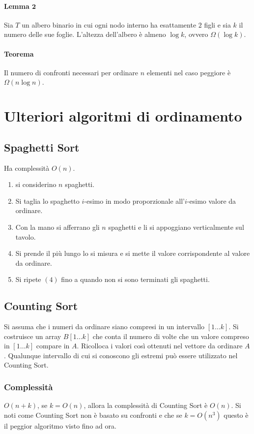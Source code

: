 \paragraph{Lemma $\mathbf{2}$}
Sia $T$ un albero binario in cui ogni nodo interno ha esattamente $2$ figli e sia $k$ il numero delle sue foglie. L'altezza dell'albero \`e almeno $\log k$, ovvero $\Omega(\log k)$. 
\paragraph{Teorema}
Il numero di confronti necessari per ordinare $n$ elementi nel caso peggiore \`e $\Omega(n\log n)$. 
\section{Ulteriori algoritmi di ordinamento}
\subsection{Spaghetti Sort}
Ha complessit\`a $O(n)$.
\begin{enumerate}
	\item si considerino $n$ spaghetti.
	\item Si taglia lo spaghetto $i$-esimo in modo proporzionale all'$i$-esimo valore da ordinare.
	\item Con la mano si afferrano gli $n$ spaghetti e li si appoggiano verticalmente sul tavolo. 
	\item Si prende il pi\`u lungo lo si misura e si mette il valore corrispondente al valore da ordinare. 
	\item Si ripete $(4)$ fino a quando non si sono terminati gli spaghetti. 
\end{enumerate}
\subsection{Counting Sort}
Si assuma che i numeri da ordinare siano compresi in un intervallo $[1\dots k]$. Si costruisce un array $B[1\dots k]$ che conta il numero di volte che un valore compreso in $[1\dots k]$
compare in $A$. Ricolloca i valori cos\`i ottenuti nel vettore da ordinare $A$. Qualunque intervallo di cui si conoscono gli estremi pu\`o essere utilizzato nel Counting Sort. \\

\subsubsection{Complessit\`a}
$O(n+k)$, se $k = O(n)$, allora la complessit\`a di Counting Sort \`e $O(n)$. Si noti come Counting Sort non \`e basato su confronti e che se $k = O(n^3)$ questo \`e il peggior algoritmo
visto fino ad ora. 
